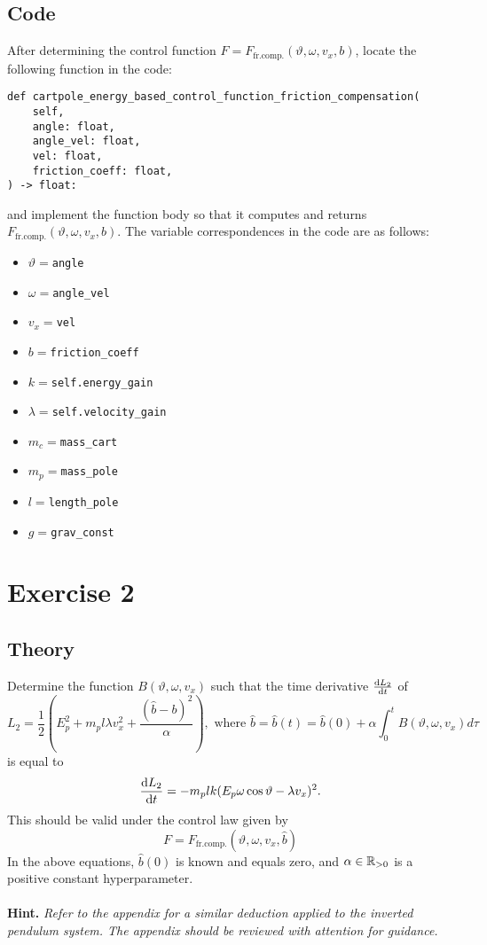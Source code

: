 \documentclass[12pt]{article}
\begin{document}
\subsection*{Code}
After determining the control function $F = F_{\text{fr.comp.}}(\vartheta, \omega, v_x, b)$, locate the following function in the code:
\begin{verbatim}
def cartpole_energy_based_control_function_friction_compensation(
    self,
    angle: float, 
    angle_vel: float, 
    vel: float, 
    friction_coeff: float, 
) -> float:
\end{verbatim}
and implement the function body so that it computes and returns $F_{\text{fr.comp.}}(\vartheta, \omega, v_x, b)$. The variable correspondences in the code are as follows:
\begin{itemize}
    \item $\vartheta=$\texttt{angle}
    \item $\omega=$\texttt{angle\_vel}
    \item $v_x=$\texttt{vel}
    \item $b=$\texttt{friction\_coeff} 
    \item $k=$\texttt{self.energy\_gain}
    \item $\lambda=$\texttt{self.velocity\_gain}
    \item $m_c=$\texttt{mass\_cart}
    \item $m_p=$\texttt{mass\_pole}
    \item $l=$\texttt{length\_pole}
    \item $g=$\texttt{grav\_const}
\end{itemize}

\section*{Exercise 2}

\subsection*{Theory}
Determine the function $B(\vartheta, \omega, v_x)$ such that the time derivative $\frac{\mathop{}\!\mathrm{d} L_2}{\mathop{}\!\mathrm{d} t}$ of
$$
L_2 = \frac{1}{2}\left(E_p^2 + m_p l\lambda v_x ^ 2 + \frac{(\hat{b} - b) ^ 2}{\alpha}\right), \text{ where } \hat{b} = \hat{b}(t) = \hat{b}(0) + \alpha\int_{0}^{t} B(\vartheta, \omega, v_x) d \tau
$$
is equal to
$$
\frac{\mathop{}\!\mathrm{d} L_2}{\mathop{}\!\mathrm{d} t} = - m_p lk (E_p\omega \cos \vartheta  - \lambda v_x)^2.
$$
This should be valid under the control law given by
$$
    F = F_{\text{fr.comp.}}(\vartheta, \omega, v_x, \hat{b})
$$
In the above equations, $\hat{b}(0)$ is known and equals zero, and  $\alpha \in {\mathbb{R}}_{>0}$ is a positive constant hyperparameter.
\\
\\
\textbf{Hint.} \textit{Refer to the appendix for a similar deduction applied to the inverted pendulum system. The appendix should be reviewed with attention for guidance.}  
\end{document}
